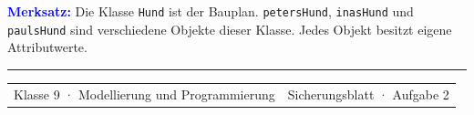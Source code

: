 \documentclass[10pt,a4paper]{article}
\begin{document}
\vspace{2.5mm}
\colorbox{Mint}{%
  \parbox{\dimexpr\linewidth-2\fboxsep\relax}{%
    \vspace{1.4mm}
    \textcolor{Blue}{\bfseries Merksatz:}
    Die Klasse \texttt{Hund} ist der Bauplan. \texttt{petersHund},
    \texttt{inasHund} und \texttt{paulsHund} sind verschiedene Objekte
    dieser Klasse. Jedes Objekt besitzt eigene Attributwerte.
    \vspace{1.4mm}
  }%
}

\vfill
{\color{Line}\rule{\linewidth}{0.5pt}}\par
\vspace{1.5mm}
\begin{tabularx}{\linewidth}{@{}Xr@{}}
  {\small\color{Muted}Klasse 9 · Modellierung und Programmierung} &
  {\small\color{Muted}Sicherungsblatt · Aufgabe 2}
\end{tabularx}
\end{document}
